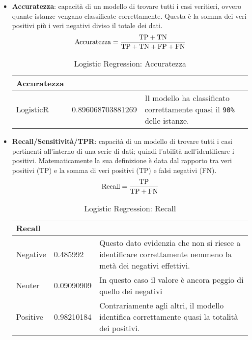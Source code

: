 \begin{itemize}
				\item \textbf{Accuratezza}: capacità di un modello di trovare tutti i casi veritieri, ovvero quante istanze vengano classificate correttamente. Questa è la somma dei veri positivi più i veri negativi diviso il totale dei dati.
					\begin{equation}
					\text{Accuratezza} = \frac{\text{TP} + \text{TN}}{\text{TP} + \text{TN} + \text{FP} + \text{FN}} \\
					\end{equation}
					
					\begin{table} [H]
						\caption{Logistic Regression: Accuratezza}
						\label{tab:accLogisticRegression}
						\centering
						\begin{tabular}{llp{}}
							\toprule 
							\textbf{Accuratezza}	\\
							\midrule
							LogisticR  & 0.896068703881269 & Il modello ha classificato correttamente quasi il \verb|90%| delle istanze.\\
							\bottomrule
						\end{tabular}
					\end{table}
				
				\item \textbf{Recall/Sensitività/TPR}: capacità di un modello di trovare tutti i casi pertinenti all’interno di una serie di dati; quindi l'abilità nell'identificare i positivi. Matematicamente la sua definizione è data dal rapporto tra veri positivi (TP) e la somma di veri positivi (TP) e falsi negativi (FN).
					\begin{equation}
					\text{Recall} = \frac{\text{TP}}{\text{TP} + \text{FN}} \\
					\end{equation}
					
					\begin{table} [H]
						\caption{Logistic Regression: Recall}
						\label{tab:RecallLogisticRegression}
						\centering
						\begin{tabular}{llp{}}
							\toprule 
							\textbf{Recall}	\\
							\midrule
							Negative  & 0.485992  & Questo dato evidenzia che non si riesce a identificare correttamente nemmeno la metà dei negativi effettivi.\\
							Neuter & 0.09090909 & In questo caso il valore è ancora peggio di quello dei negativi\\
							Positive & 0.98210184 & Contrariamente agli altri, il modello identifica correttamente quasi la totalità dei positivi.\\
							\bottomrule
						\end{tabular}
					\end{table}
				

\end{itemize}
